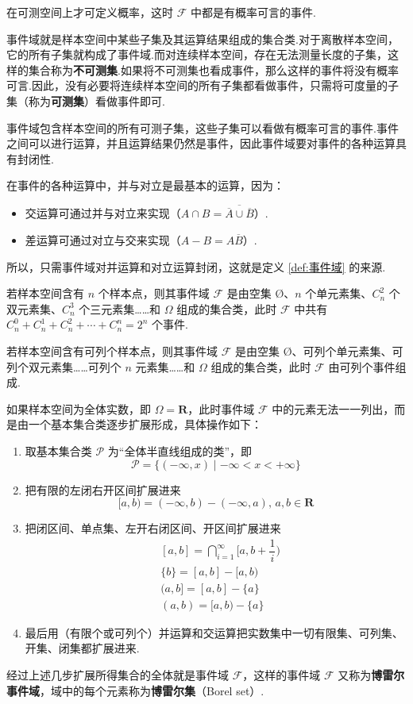 在可测空间上才可定义概率，这时 $\mathcal{F}$ 中都是有概率可言的事件.

\begin{note}
    \indent 事件域就是样本空间中某些子集及其运算结果组成的集合类.对于离散样本空间，它的所有子集就构成了事件域.而对连续样本空间，存在无法测量长度的子集，这样的集合称为\textbf{不可测集}.如果将不可测集也看成事件，那么这样的事件将没有概率可言.因此，没有必要将连续样本空间的所有子集都看做事件，只需将可度量的子集（称为\textbf{可测集}）看做事件即可.

    \indent 事件域包含样本空间的所有可测子集，这些子集可以看做有概率可言的事件.事件之间可以进行运算，并且运算结果仍然是事件，因此事件域要对事件的各种运算具有封闭性.

    \indent 在事件的各种运算中，并与对立是最基本的运算，因为：
    \begin{itemize}
        \item 交运算可通过并与对立来实现（$A \cap B = \overline{\overline{A} \cup \overline{B}}$）.
        \item 差运算可通过对立与交来实现（$A-B = A \overline{B}$）.
    \end{itemize}
    所以，只需事件域对并运算和对立运算封闭，这就是定义 \ref{def:事件域} 的来源.
\end{note}

若样本空间含有 $n$ 个样本点，则其事件域 $\mathcal{F}$ 是由空集 $\text{\O}$、$n$ 个单元素集、$C_n^2$ 个双元素集、$C_n^3$ 个三元素集……和 $\varOmega$ 组成的集合类，此时 $\mathcal{F}$ 中共有 $C_n^0 + C_n^1 + C_n^2 + \cdots + C_n^n = 2^n$ 个事件.

若样本空间含有可列个样本点，则其事件域 $\mathcal{F}$ 是由空集 $\text{\O}$、可列个单元素集、可列个双元素集……可列个 $n$ 元素集……和 $\varOmega$ 组成的集合类，此时 $\mathcal{F}$ 由可列个事件组成.

如果样本空间为全体实数，即 $\varOmega = \mathbf{R}$，此时事件域 $\mathcal{F}$ 中的元素无法一一列出，而是由一个基本集合类逐步扩展形成，具体操作如下：
\begin{enumerate}
    \item 取基本集合类 $\mathcal{P}$ 为“全体半直线组成的类”，即
    $$
    \mathcal{P} = \{ (-\infty, x) \mid -\infty < x < +\infty \}
    $$
    \item 把有限的左闭右开区间扩展进来
    $$
    [a,b) = (-\infty,b) - (-\infty,a), \, a,b \in \mathbf{R}
    $$
    \item 把闭区间、单点集、左开右闭区间、开区间扩展进来
    $$
    \begin{aligned}
        & [a,b] = \bigcap_{i=1}^{\infty} \Big[ a, b + \dfrac{1}{i} \Big) \\
        & \{ b \} = [a,b] - [a,b) \\
        & (a,b] = [a,b] - \{ a \} \\
        & (a,b) = [a,b) - \{ a \}
    \end{aligned}
    $$
    \item 最后用（有限个或可列个）并运算和交运算把实数集中一切有限集、可列集、开集、闭集都扩展进来.
\end{enumerate}
经过上述几步扩展所得集合的全体就是事件域 $\mathcal{F}$，这样的事件域 $\mathcal{F}$ 又称为\textbf{博雷尔事件域}，域中的每个元素称为\textbf{博雷尔集}（Borel set）.


